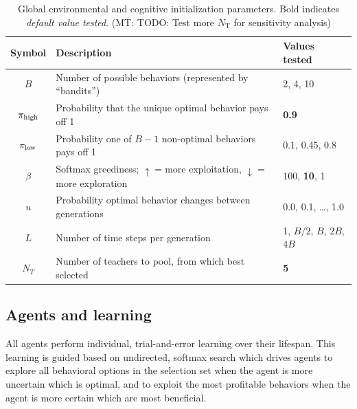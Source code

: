 \documentclass[letterpaper,11.5pt]{scrartcl}
\newcommand{\mt}[1]{{\textcolor{myorange} {({\tiny MT:} #1)}}}
\begin{document}
\vspace{2em}
\begin{table}[h]
    \caption{Global environmental and cognitive initialization parameters.
      Bold indicates \emph{default value tested}.
    \mt{TODO: Test more $N_\text{T}$ for sensitivity analysis}}
    \label{tab:modelParameters}
    \centering %
    \begin{tabular}{cp{4.0in}p{1.25in}} \toprule

        Symbol & Description & Values tested \\ 

        \midrule  

        $B$       & Number of possible behaviors (represented by ``bandits'') 
                  & 2, 4, 10 \\

        $\pi_{\mathrm{high}}$ & Probability that the unique optimal behavior pays off 1 
                & \textbf{0.9} \\

        $\pi_{\mathrm{low}}$ & Probability one of $B - 1$ non-optimal behaviors pays off 1 
                 & 0.1, 0.45, 0.8 \\ 

        $\beta$ & Softmax greediness; $\uparrow=$more exploitation, $\downarrow=$more
                    exploration 
               & 100, \textbf{10}, 1 \\
        
        $u$    & Probability optimal behavior changes between generations 
               & 0.0, 0.1, \ldots, 1.0 \\

        $L$    & Number of time steps per generation & 1, $B/2$, $B$, $2B$, $4B$ \\

        $N_T$    & Number of teachers to pool, from which best selected 
                 & \textbf{5}  \\

            
               
        \bottomrule
        \end{tabular} 
\end{table}


\subsection{Agents and learning}

All agents perform individual, trial-and-error learning over their lifespan.
This learning is guided based on undirected, softmax search which drives
agents to explore all behavioral options in the selection set when 
the agent is more uncertain which is optimal, and to exploit the most profitable
behaviors when the agent is more certain which are most beneficial.
\end{document}
